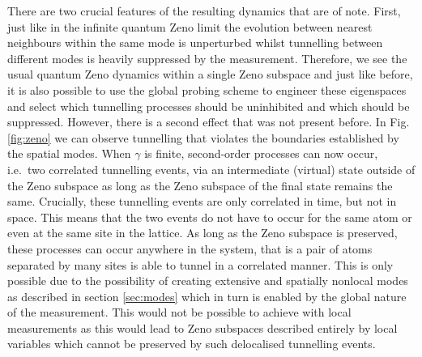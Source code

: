 There are two crucial features of the resulting dynamics that are of
note. First, just like in the infinite quantum Zeno limit the
evolution between nearest neighbours within the same mode is
unperturbed whilst tunnelling between different modes is heavily
suppressed by the measurement. Therefore, we see the usual quantum
Zeno dynamics within a single Zeno subspace and just like before, it
is also possible to use the global probing scheme to engineer these
eigenspaces and select which tunnelling processes should be
uninhibited and which should be suppressed. However, there is a second
effect that was not present before. In Fig. \ref{fig:zeno} we can
observe tunnelling that violates the boundaries established by the
spatial modes. When $\gamma$ is finite, second-order processes can now
occur, i.e.~two correlated tunnelling events, via an intermediate
(virtual) state outside of the Zeno subspace as long as the Zeno
subspace of the final state remains the same. Crucially, these
tunnelling events are only correlated in time, but not in space. This
means that the two events do not have to occur for the same atom or
even at the same site in the lattice. As long as the Zeno subspace is
preserved, these processes can occur anywhere in the system, that is a
pair of atoms separated by many sites is able to tunnel in a
correlated manner. This is only possible due to the possibility of
creating extensive and spatially nonlocal modes as described in
section \ref{sec:modes} which in turn is enabled by the global nature
of the measurement. This would not be possible to achieve with local
measurements as this would lead to Zeno subspaces described entirely
by local variables which cannot be preserved by such delocalised
tunnelling events.

